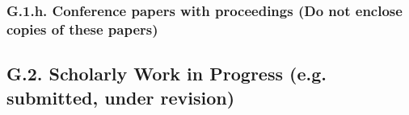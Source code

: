 \documentclass[12pt]{article}
\begin{document}
\subsubsection*{G.1.h. Conference papers with proceedings (Do not enclose copies of these papers)}

\subsection*{G.2. Scholarly Work in Progress (e.g. submitted, under revision)}
\end{document}

